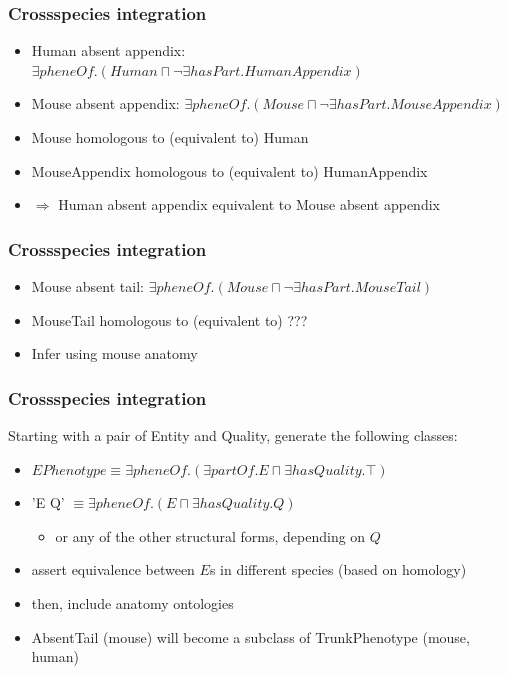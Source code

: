 \documentclass{beamer}
\begin{document}
\begin{frame}
  \frametitle{Crossspecies integration}
  \begin{itemize}
  \item Human absent appendix: $\exists pheneOf.(Human \sqcap \neg
    \exists hasPart.HumanAppendix)$
  \item Mouse absent appendix: $\exists pheneOf.(Mouse \sqcap \neg
    \exists hasPart.MouseAppendix)$
  \item Mouse homologous to (equivalent to) Human
  \item MouseAppendix homologous to (equivalent to) HumanAppendix
  \item $\Rightarrow$ Human absent appendix equivalent to Mouse absent
    appendix
  \end{itemize}
\end{frame}

\begin{frame}
  \frametitle{Crossspecies integration}
  \begin{itemize}
  \item Mouse absent tail: $\exists pheneOf.(Mouse \sqcap \neg
    \exists hasPart.MouseTail)$
  \item MouseTail homologous to (equivalent to) ???
    \pause 
  \item Infer using mouse anatomy
  \end{itemize}
\end{frame}

\begin{frame}
  \frametitle{Crossspecies integration}
  Starting with a pair of Entity and Quality, generate the following classes:
  \begin{itemize}
  \item $EPhenotype \equiv \exists pheneOf.(\exists partOf.E \sqcap
    \exists hasQuality.\top)$
  \item 'E Q' $\equiv \exists pheneOf.(E \sqcap \exists hasQuality.Q)$
    \begin{itemize}
    \item or any of the other structural forms, depending on $Q$
    \end{itemize}
  \item assert equivalence between $E$s in different species (based on
    homology)
  \item then, include anatomy ontologies
    \pause
  \item AbsentTail (mouse) will become a subclass of TrunkPhenotype
    (mouse, human)
  \end{itemize}
\end{frame}
\end{document}

